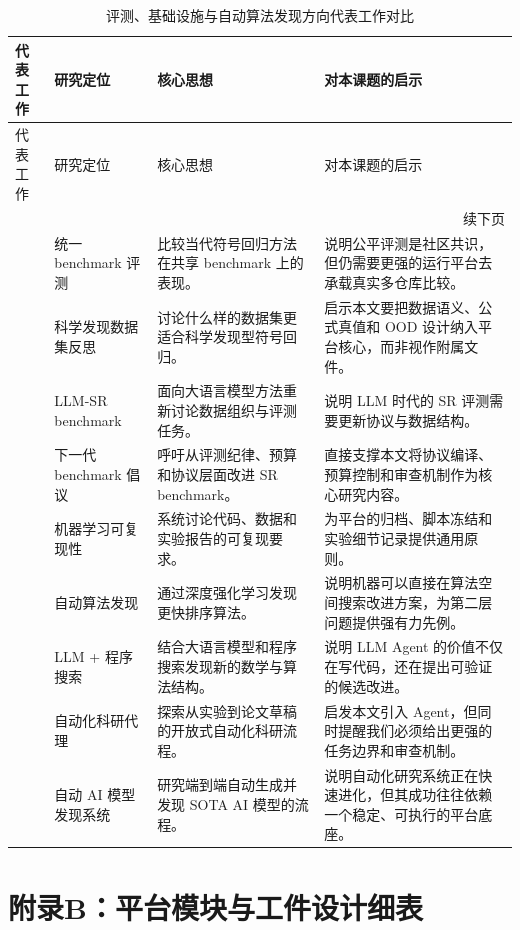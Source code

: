 \documentclass[UTF8,12pt]{ctexart}
\begin{document}
\small
\begin{longtable}{p{2.8cm}p{3.0cm}p{4.7cm}p{4.7cm}}
\caption{评测、基础设施与自动算法发现方向代表工作对比}\label{tab:related-benchmark-agent}\\
\toprule
代表工作 & 研究定位 & 核心思想 & 对本课题的启示 \\
\midrule
\endfirsthead
\toprule
代表工作 & 研究定位 & 核心思想 & 对本课题的启示 \\
\midrule
\endhead
\midrule
\multicolumn{4}{r}{续下页}\\
\endfoot
\bottomrule
\endlastfoot
\citet{lacava2021srbench} & 统一 benchmark 评测 & 比较当代符号回归方法在共享 benchmark 上的表现。 & 说明公平评测是社区共识，但仍需要更强的运行平台去承载真实多仓库比较。 \\
\citet{matsubara2022rethinking} & 科学发现数据集反思 & 讨论什么样的数据集更适合科学发现型符号回归。 & 启示本文要把数据语义、公式真值和 OOD 设计纳入平台核心，而非视作附属文件。 \\
\citet{shojaee2025llmsrbench} & LLM-SR benchmark & 面向大语言模型方法重新讨论数据组织与评测任务。 & 说明 LLM 时代的 SR 评测需要更新协议与数据结构。 \\
\citet{aldeia2025call} & 下一代 benchmark 倡议 & 呼吁从评测纪律、预算和协议层面改进 SR benchmark。 & 直接支撑本文将协议编译、预算控制和审查机制作为核心研究内容。 \\
\citet{pineau2021improving} & 机器学习可复现性 & 系统讨论代码、数据和实验报告的可复现要求。 & 为平台的归档、脚本冻结和实验细节记录提供通用原则。 \\
\citet{mankowitz2023alphadev} & 自动算法发现 & 通过深度强化学习发现更快排序算法。 & 说明机器可以直接在算法空间搜索改进方案，为第二层问题提供强有力先例。 \\
\citet{romeraparedes2024funsearch} & LLM + 程序搜索 & 结合大语言模型和程序搜索发现新的数学与算法结构。 & 说明 LLM Agent 的价值不仅在写代码，还在提出可验证的候选改进。 \\
\citet{lu2024aiscientist} & 自动化科研代理 & 探索从实验到论文草稿的开放式自动化科研流程。 & 启发本文引入 Agent，但同时提醒我们必须给出更强的任务边界和审查机制。 \\
\citet{li2026autosota} & 自动 AI 模型发现系统 & 研究端到端自动生成并发现 SOTA AI 模型的流程。 & 说明自动化研究系统正在快速进化，但其成功往往依赖一个稳定、可执行的平台底座。 \\
\end{longtable}
\normalsize

\section{附录B：平台模块与工件设计细表}
\end{document}
